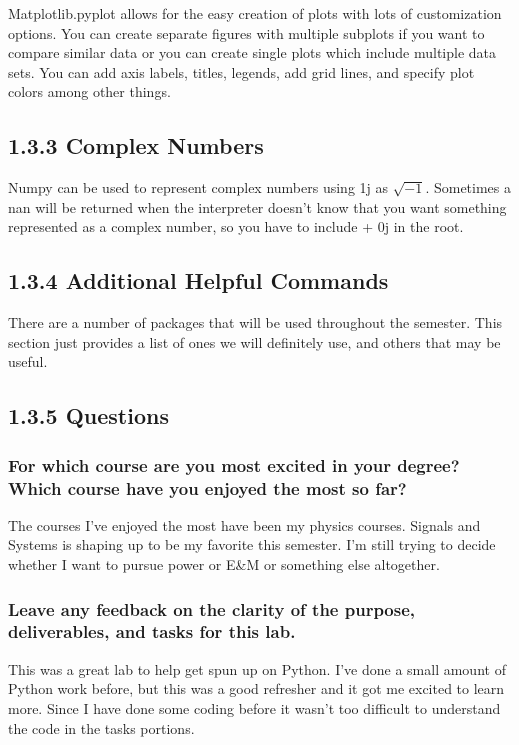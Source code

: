 \documentclass{article}
\begin{document}
Matplotlib.pyplot allows for the easy creation of plots with lots of customization options. You can create separate figures with multiple subplots if you want to compare similar data or you can create single plots which include multiple data sets. You can add axis labels, titles, legends, add grid lines, and  specify plot colors among other things.

\subsection{1.3.3 Complex Numbers}

Numpy can be used to represent complex numbers using 1j as  $\sqrt{-1}$. Sometimes a nan will be returned when the interpreter doesn't know that you want something represented as a complex number, so you have to include + 0j in the root.

\subsection{1.3.4 Additional Helpful Commands}

There are a number of packages that will be used throughout the semester. This section just provides a list of ones we will definitely use, and others that may be useful.

\subsection{1.3.5 Questions}

\subsubsection{For which course are you most excited in your degree? Which course have you enjoyed the
most so far?}

The courses I've enjoyed the most have been my physics courses. Signals and Systems is shaping up to be my favorite this semester. I'm still trying to decide whether I want to pursue power or E\&M or something else altogether.

\subsubsection{Leave any feedback on the clarity of the purpose, deliverables, and tasks for this lab.}

This was a great lab to help get spun up on Python. I've done a small amount of Python work before, but this was a good refresher and it got me excited to learn more. Since I have done some coding before it wasn't too difficult to understand the code in the tasks portions.
\end{document}
